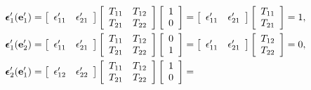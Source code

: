 \begin{subequations}
\begin{align}
  \boldsymbol\epsilon_1'( \mathbf{e}_1' ) &= 
  \left[ \begin{array}{c c} \epsilon_{11}' & \epsilon_{21}' \end{array} \right] 
  \left[ \begin{array}{c c} T_{11} & T_{12} \\ T_{21} & T_{22} \end{array} \right] 
  \left[ \begin{array}{c} 1 \\ 0 \end{array} \right] =
  \left[ \begin{array}{c c} \epsilon_{11}' & \epsilon_{21}' \end{array} \right] 
  \left[ \begin{array}{c} T_{11} \\ T_{21} \end{array} \right] = 1 , \\
  \boldsymbol\epsilon_1'( \mathbf{e}_2' ) &= 
  \left[ \begin{array}{c c} \epsilon_{11}' & \epsilon_{21}' \end{array} \right] 
  \left[ \begin{array}{c c} T_{11} & T_{12} \\ T_{21} & T_{22} \end{array} \right] 
  \left[ \begin{array}{c} 0 \\ 1 \end{array} \right] =
  \left[ \begin{array}{c c} \epsilon_{11}' & \epsilon_{21}' \end{array} \right] 
  \left[ \begin{array}{c} T_{12} \\ T_{22} \end{array} \right] = 0 , \\
  \boldsymbol\epsilon_2'( \mathbf{e}_1' ) &= 
  \left[ \begin{array}{c c} \epsilon_{12}' & \epsilon_{22}' \end{array} \right] 
  \left[ \begin{array}{c c} T_{11} & T_{12} \\ T_{21} & T_{22} \end{array} \right] 
  \left[ \begin{array}{c} 1 \\ 0 \end{array} \right] =

\end{align}
\end{subequations}
